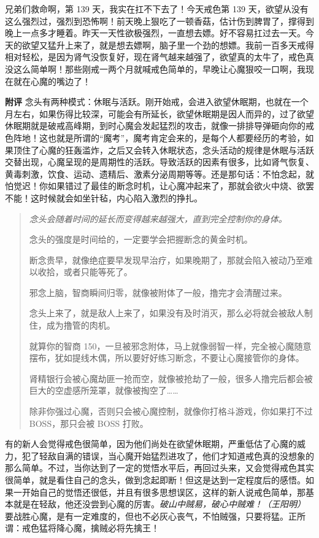 \begin{case}
    兄弟们救命啊，第 139 天，我实在扛不下去了！今天戒色第 139 天，欲望从没有这么强烈过，强烈到恐怖啊！前天晚上狠吃了一顿香菇，估计伤到脾胃了，撑得到晚上一点多才睡着。昨天一天性欲极强烈，一直想去嫖。好不容易扛过去一天。今天的欲望又猛升上来了，就是想去嫖啊，脑子里一个劲的想嫖。我前一百多天戒得相对轻松，是因为肾气没恢复好，现在肾气越来越强了，欲望真的太牛了，戒色真没这么简单啊！那些刚戒一两个月就喊戒色简单的，早晚让心魔狠咬一口啊，我现在就在心魔的嘴边了！

    \textbf{附评} 念头有两种模式：休眠与活跃。刚开始戒，会进入欲望休眠期，也就在一个月左右，如果伤得比较深，可能会有所延长，欲望休眠期是因人而异的，过了欲望休眠期就是破戒高峰期，到时心魔会发起猛烈的攻击，就像一排排导弹砸向你的戒色阵地！这也就是所谓的“魔考”，魔考肯定会来的，是每个人都要经历的考验，如果顶住了心魔的狂轰滥炸，之后又会转入休眠状态，念头活动的规律是休眠与活跃交替出现，心魔呈现的是周期性的活跃。导致活跃的因素有很多，比如肾气恢复、黄毒刺激，饮食、运动、遗精后、激素分泌周期等等。还是那句话：不怕念起，就怕觉迟！你如果错过了最佳的断念时机，让心魔冲起来了，那就会欲火中烧、欲罢不能！这时候就会如坐针毡，内心陷入激烈的挣扎。

    \begin{quotation}\it
        念头会随着时间的延长而变得越来越强大，直到完全控制你的身体。

        念头的强度是时间给的，一定要学会把握断念的黄金时机。

        断念贵早，就像绝症要早发现早治疗，如果晚期了，那就会陷入被动乃至难以收拾，或者只能等死了。

        邪念上脑，智商瞬间归零，就像被附体了一般，撸完才会清醒过来。

        念头上来了，就是敌人上来了，如果没有及时消灭，那么必将就会被敌人制住，成为撸管的肉机。

        就算你的智商 150，一旦被邪念附体，马上就像弱智一样，完全被心魔随意摆布，犹如提线木偶，所以要好好练习断念，不要让心魔接管你的身体。

        肾精银行会被心魔劫匪一抢而空，就像被抢劫了一般，很多人撸完后都会被巨大的空虚感所笼罩，就像被掏空了……

        除非你强过心魔，否则只会被心魔控制，就像你打格斗游戏，你如果打不过 BOSS，那只会被 BOSS 打败。
    \end{quotation}

    有的新人会觉得戒色很简单，因为他们尚处在欲望休眠期，严重低估了心魔的威力，犯了轻敌自满的错误，当心魔开始猛烈进攻了，他们才知道戒色真的没想象的那么简单。不过，当你达到了一定的觉悟水平后，再回过头来，又会觉得戒色其实很简单，就是看住自己的念头，做到念起即断！但这是达到一定程度后的感悟。如果一开始自己的觉悟还很低，并且有很多思想误区，这样的新人说戒色简单，那基本就是在轻敌，他还没尝到心魔的厉害。\textit{破山中贼易，破心中贼难！（王阳明）} 要战胜心魔，是有一定难度的，但也不必灰心丧气，不怕贼强，只要将猛。正所谓：戒色猛将降心魔，擒贼必将先擒王！
\end{case}

